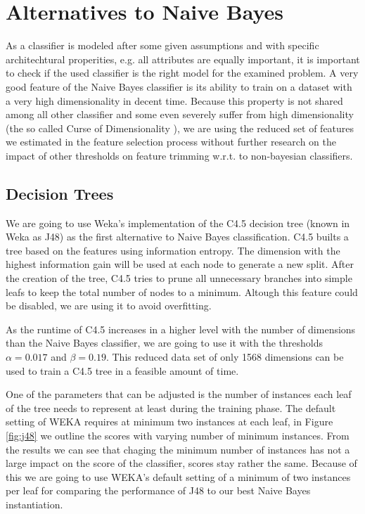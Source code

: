 \section{Alternatives to Naive Bayes}
As a classifier is modeled after some given assumptions and with specific architechtural properities, e.g. all attributes are equally important, it is important to check if the used classifier is the right model for the examined problem.
A very good feature of the Naive Bayes classifier is its ability to train on a dataset with a very high dimensionality in decent time.
Because this property is not shared among all other classifier and some even severely suffer from high dimensionality (the so called Curse of Dimensionality \cite{bellman1957dynamic}), we are using the reduced set of features we estimated in the feature selection process without further research on the impact of other thresholds on feature trimming w.r.t. to non-bayesian classifiers.

\subsection{Decision Trees}

We are going to use Weka's \cite{hall2009weka} implementation of the C4.5 decision tree \cite{Quinlan1993} (known in Weka as J48) as the first alternative to Naive Bayes classification.
C4.5 builts a tree based on the features using information entropy.
The dimension with the highest information gain will be used at each node to generate a new split.
After the creation of the tree, C4.5 tries to prune all unnecessary branches into simple leafs to keep the total number of nodes to a minimum.
Altough this feature could be disabled, we are using it to avoid overfitting.

As the runtime of C4.5 increases in a higher level with the number of dimensions than the Naive Bayes classifier, we are going to use it with the thresholds $\alpha=0.017$ and $\beta=0.19$.
This reduced data set of only 1568 dimensions can be used to train a C4.5 tree in a feasible amount of time.



One of the parameters that can be adjusted is the number of instances each leaf of the tree needs to represent at least during the training phase.
The default setting of WEKA requires at minimum two instances at each leaf, in Figure \ref{fig:j48} we outline the scores with varying number of minimum instances.
From the results we can see that chaging the minimum number of instances has not a large impact on the score of the classifier, scores stay rather the same.
Because of this we are going to use WEKA's default setting of a minimum of two instances per leaf for comparing the performance of J48 to our best Naive Bayes instantiation.

